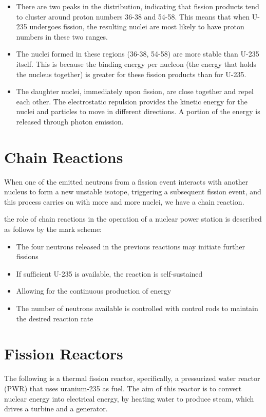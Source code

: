\documentclass[a4paper,12pt]{article}
\let\oldsection\section
\renewcommand\section{\clearpage\oldsection}
\begin{document}
\begin{itemize}
  \item There are two peaks in the distribution, indicating that fission products tend to cluster around proton numbers 36-38 and 54-58. This means that when U-235 undergoes fission, the resulting nuclei are most likely to have proton numbers in these two ranges.
  \item The nuclei formed in these regions (36-38, 54-58) are more stable than U-235 itself. This is because the binding energy per nucleon (the energy that holds the nucleus together) is greater for these fission products than for U-235.
  \item The daughter nuclei, immediately upon fission, are close together and repel each other. The electrostatic repulsion provides the kinetic energy for the nuclei and particles to move in different directions. A portion of the energy is released through photon emission.
\end{itemize}

\section{Chain Reactions}

When one of the emitted neutrons from a fission event interacts with another nucleus to form a new unstable isotope, triggering a subsequent fission event, and this process carries on with more and more nuclei, we have a chain reaction.

the role of chain reactions in the operation of a nuclear power station is described as follows by the mark scheme:
\begin{itemize}
  \item The four neutrons released in the previous reactions may initiate further fissions
  \item If sufficient U-235 is available, the reaction is self-sustained
  \item Allowing for the continuous production of energy
  \item The number of neutrons available is controlled with control rods to maintain the desired reaction rate
\end{itemize}

\section{Fission Reactors}

The following is a thermal fission reactor, specifically, a pressurized water reactor (PWR) that uses uranium-235 as fuel. The aim of this reactor is to convert nuclear energy into electrical energy, by heating water to produce steam, which drives a turbine and a generator.
\end{document}
